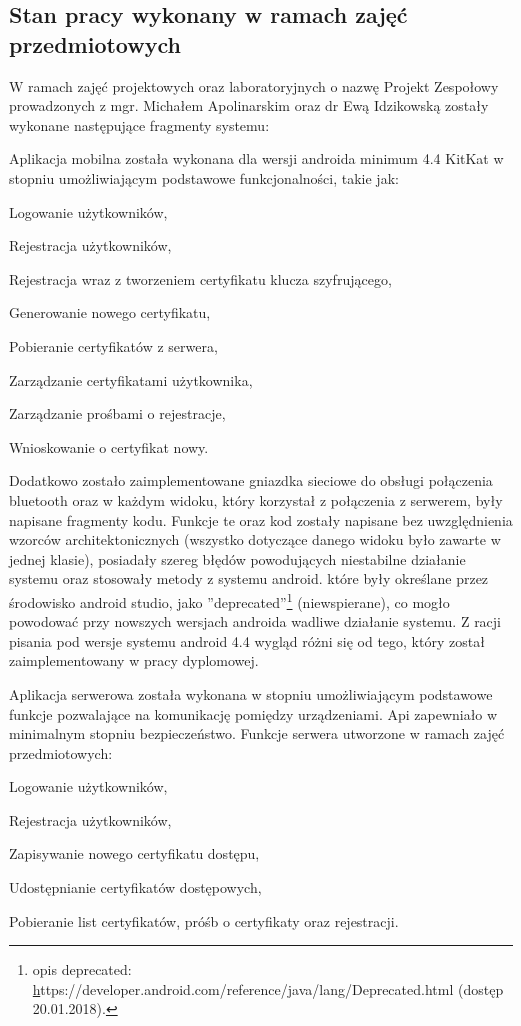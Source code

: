 \newpage
\subsection{Stan pracy wykonany w ramach zajęć \newline przedmiotowych} 
W ramach zajęć projektowych oraz laboratoryjnych o nazwę Projekt Zespołowy prowadzonych z mgr. Michałem Apolinarskim oraz dr Ewą Idzikowską zostały wykonane następujące fragmenty systemu:
	
	Aplikacja mobilna została wykonana dla wersji androida minimum 4.4 KitKat w stopniu umożliwiającym podstawowe funkcjonalności, takie jak:
	\begin{itemize*}
		\item Logowanie użytkowników,
		\item Rejestracja użytkowników,
		\item Rejestracja wraz z tworzeniem certyfikatu klucza szyfrującego,
		\item Generowanie nowego certyfikatu,
		\item Pobieranie certyfikatów z serwera,
		\item Zarządzanie certyfikatami użytkownika,
		\item Zarządzanie prośbami o rejestracje,
		\item Wnioskowanie o certyfikat nowy.
	\end{itemize*}

		Dodatkowo zostało zaimplementowane gniazdka sieciowe do obsługi połączenia bluetooth oraz w każdym widoku, który korzystał z połączenia z serwerem, były napisane fragmenty kodu. Funkcje te oraz kod zostały napisane bez uwzględnienia wzorców architektonicznych (wszystko dotyczące danego widoku było zawarte w jednej klasie), posiadały szereg błędów powodujących niestabilne działanie systemu oraz stosowały metody z systemu android. które były określane przez środowisko android studio, jako ''deprecated''\footnote{opis deprecated: \hyperref[sec:trona internetowa z opiscem eprecated] https://developer.android.com/reference/java/lang/Deprecated.html (dostęp 20.01.2018).}  (niewspierane), co mogło powodować przy nowszych wersjach androida wadliwe działanie systemu. Z racji pisania pod wersje systemu android 4.4 wygląd różni się od tego, który został zaimplementowany w pracy dyplomowej.

   Aplikacja serwerowa została wykonana w stopniu umożliwiającym podstawowe funkcje pozwalające na komunikację pomiędzy urządzeniami. Api zapewniało w minimalnym stopniu bezpieczeństwo. Funkcje serwera utworzone w ramach zajęć przedmiotowych:
   	\begin{itemize*}
   		\item Logowanie użytkowników,
   		\item Rejestracja użytkowników,
   		\item Zapisywanie nowego certyfikatu dostępu,
   		\item Udostępnianie certyfikatów dostępowych,
   		\item Pobieranie list certyfikatów, próśb o certyfikaty oraz rejestracji.
   	\end{itemize*}
   
